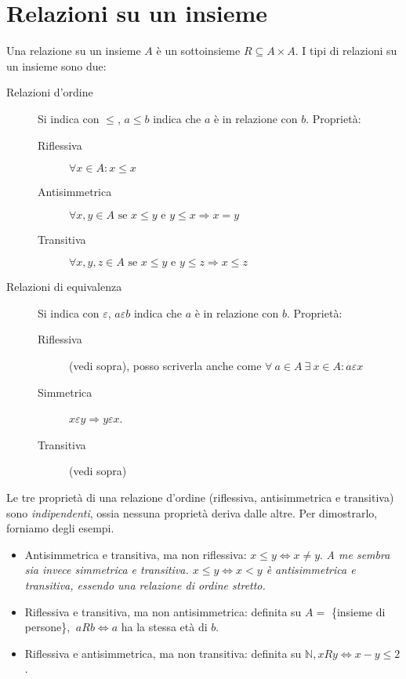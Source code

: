 \section{Relazioni su un insieme}

Una relazione su un insieme $A$ \`e un sottoinsieme $R \subseteq A \times A$. I tipi di relazioni su un insieme sono due:

\begin{description}
    \item[Relazioni d'ordine] Si indica con $\le$, $a \leq b$ indica che $a$ \`e in relazione con $b$. Propriet\`a:
    \begin{description}
        \item [Riflessiva] $\forall x \in A : x \leq x$
        \item [Antisimmetrica] $\forall x, y \in A \text{ se } x \leq y \text{ e }  y \leq x \Rightarrow x = y$
        \item [Transitiva] $\forall x, y, z \in A \text{ se } x \leq y \text{ e } y \leq z \Rightarrow x \leq z$
    \end{description}
    \item[Relazioni di equivalenza] Si indica con $\varepsilon$, $a \varepsilon b$ indica che $a$ \`e in relazione con $b$. Propriet\`a:
    \begin{description}
      \item [Riflessiva] (vedi sopra), posso scriverla anche come $\forall \ a \in A \ \exists \ x \in A : a \varepsilon x$
      \item [Simmetrica] $x \varepsilon y \Rightarrow y \varepsilon x$.
      \item [Transitiva] (vedi sopra)
    \end{description}
\end{description}

Le tre propriet\`a di una relazione d'ordine (riflessiva, antisimmetrica e transitiva) sono \textit{indipendenti}, ossia nessuna propriet\`a deriva dalle altre. Per dimostrarlo, forniamo degli esempi.
\begin{itemize}
  \item Antisimmetrica e transitiva, ma non riflessiva: $x \le y \Leftrightarrow x \neq y$. \textit{A me sembra sia invece simmetrica e transitiva. $x \le y \Leftrightarrow x < y$ \`e antisimmetrica e transitiva, essendo una relazione di ordine stretto.}
  \item Riflessiva e transitiva, ma non antisimmetrica: definita su $A = $ \{insieme di persone\}, $ \ a R b \Leftrightarrow a$ ha la stessa et\`a di $b$.
  \item Riflessiva e antisimmetrica, ma non transitiva: definita su $\mathbb{N}, x R y \Leftrightarrow x - y \le 2$.
\end{itemize}

